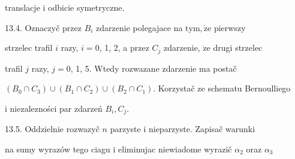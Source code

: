 \documentclass[a4paper,12pt]{article}
\begin{document}
translacje $\mathrm{i}$ odbicie symetryczne.

13.4. Oznaczyč przez $B_{i}$ zdarzenie polegajace na $\mathrm{t}\mathrm{y}\mathrm{m}, \dot{\mathrm{z}}\mathrm{e}$ pierwszy

strzelec trafil $i$ razy, $i=0$, 1, 2, a przez $C_{j}$ zdarzenie, $\dot{\mathrm{z}}\mathrm{e}$ drugi strzelec

trafil $j$ razy, $j = 0$, 1, 5. Wtedy rozwazane zdarzenie ma postač

$(B_{0}\cap C_{3})\cup(B_{1}\cap C_{2})\cup(B_{2}\cap C_{1})$. Korzystač ze schematu Bernoulliego

$\mathrm{i}$ niezalezności par zdarzeń $B_{i}, C_{j}.$

13.5. Oddzielnie rozwazyč $n$ parzyste $\mathrm{i}$ nieparzyste. Zapisač warunki

na sumy wyrazów tego ciagu $\mathrm{i}$ eliminujac niewiadome wyrazič $\alpha_{2}$ oraz $\alpha_{3}$
\end{document}
